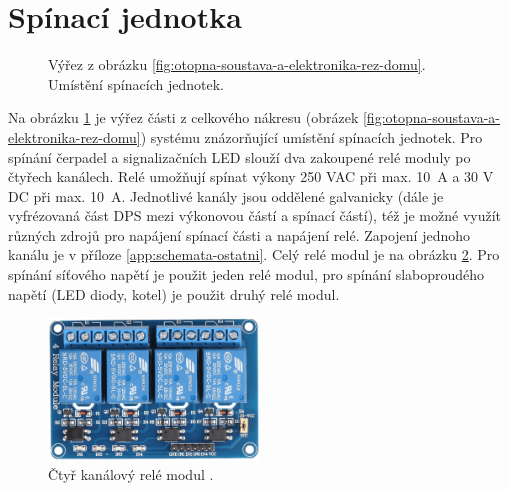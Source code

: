 \section{Spínací jednotka}
\begin{figure}[H]
   \centering
   \def\svgwidth{0.4\columnwidth}
   
    \caption[Umístění spínacích jednotek.]{Výřez z obrázku \ref{fig:otopna-soustava-a-elektronika-rez-domu}. Umístění spínacích jednotek.}
    \label{fig:vyrez-spinaci-jednotka}
\end{figure}
Na obrázku \ref{fig:vyrez-spinaci-jednotka} je výřez části z celkového nákresu (obrázek \ref{fig:otopna-soustava-a-elektronika-rez-domu}) systému znázorňující umístění spínacích jednotek. Pro spínání čerpadel a signalizačních LED slouží dva zakoupené relé moduly po čtyřech kanálech. Relé umožňují spínat výkony 250 VAC při max. 10~A a 30 V DC při max. 10~A. Jednotlivé kanály jsou oddělené galvanicky (dále je vyfrézovaná část DPS mezi výkonovou částí a spínací částí), též je možné využít různých zdrojů pro napájení spínací části a napájení relé. Zapojení jednoho kanálu je v příloze \ref{app:schemata-ostatni}. Celý relé modul je na obrázku \ref{fig:ctyr-kanalovy-rele-modul}. Pro spínání síťového napětí je použit jeden relé modul, pro spínání slaboproudého napětí (LED diody, kotel) je použit druhý relé modul.



\begin{figure}[H]
    \centering
    \includegraphics[width=0.5\textwidth]{images/ctyr-kanalovy-rele-modul.png}
    \caption[Čtyř kanálový relé modul.]{Čtyř kanálový relé modul \cite{ctyr-kanalovy-rele-modul}.}
    \label{fig:ctyr-kanalovy-rele-modul}
\end{figure}